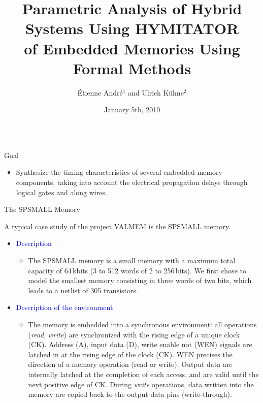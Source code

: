 \documentclass[final]{beamer}
\title[HYMITATOR]{Parametric Analysis of Hybrid Systems Using HYMITATOR \\[0.5cm]
	of Embedded Memories Using Formal Methods}
\author[Ulrich K\"uhne]{\'Etienne Andr\'e$^1$ and Ulrich K\"uhne$^2$}
\institute[LSV, LIP6 and ST]{
	$^1$LIPN, CNRS UMR 7030, Université Paris 13, France \\
	$^2$Group for Computer Architecture, University of Bremen, Germany
	}
\date{January 5th, 2010}
\newcommand{\coulitem}[1]{\textcolor{blue}{#1}}
\begin{document}
\begin{frame}{} 

\begin{columns}[t]


\begin{column}{.45\linewidth}
    

\begin{block}{Goal}

\begin{itemize}
	\item Synthesize the timing characteristics of several embedded memory components, taking into account the electrical propagation delays through logical gates and along wires.
\end{itemize}

\end{block}



\begin{block}{The SPSMALL Memory}

A typical case study of the project VALMEM is the SPSMALL memory.

\begin{itemize}
	\item \coulitem{Description}
	\begin{itemize}
		\item The SPSMALL memory is a small memory with a maximum total capacity of 64\,kbits (3 to 512 words of 2 to 256\,bits).
		We first chose to model the smallest memory consisting in three words of two bits, which leads to a netlist of 305 transistors.
	\end{itemize}


	\item \coulitem{Description of the environment}
	\begin{itemize}
		\item The memory is  embedded into a synchronous environment: all operations (\emph{read}, \emph{write}) are synchronized with the rising edge of a unique clock (CK).
		Address (A), input data (D), write enable not (WEN) signals are latched in at the rising edge of the clock (CK).
		WEN precises the direction of a memory operation (read or write).
		Output data are internally latched at the completion of each access, and are valid until the next positive edge of CK.
		During \emph{write} operations, data written into the memory are copied back to the output data pins (write-through).
	\end{itemize}
	

\end{itemize}
\end{block}
\end{column}
\end{columns}
\end{frame}
\end{document}
